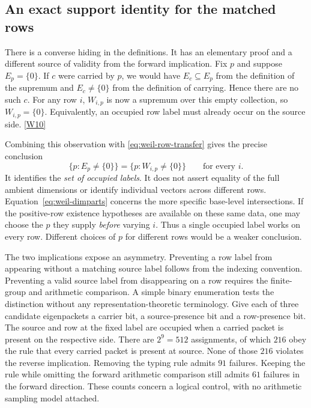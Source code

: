 \documentclass[12pt,letterpaper]{article}
\begin{document}
\subsection{An exact support identity for the matched rows}
\label{sec:support-equality}
There is a converse hiding in the definitions. It has an elementary proof and a different source of validity from the forward implication. Fix \(p\) and suppose \(E_p=\{0\}\). If \(c\) were carried by \(p\), we would have \(E_c\subseteq E_p\) from the definition of the supremum and \(E_c\ne\{0\}\) from the definition of carrying. Hence there are no such \(c\). For any row \(i\), \(W_{i,p}\) is now a supremum over this empty collection, so \(W_{i,p}=\{0\}\). Equivalently, an occupied row label must already occur on the source side. \href{https://github.com/nousentllc/riemann-hypothesis/blob/40e56bab026552e089d7afcfeff08d2defb9c005/src/Formalism/LocalToGlobal/IndefiniteReal/ZeroPartEigenvalueConvention.lean#L103-L213}{\textsf{[W10]}}

Combining this observation with \eqref{eq:weil-row-transfer} gives the precise conclusion
\[
   \{p:E_p\ne\{0\}\}=\{p:W_{i,p}\ne\{0\}\}
       \qquad \text{for every }i .
\]
It identifies the \emph{set of occupied labels}. It does not assert equality of the full ambient dimensions or identify individual vectors across different rows. Equation~\eqref{eq:weil-dimparts} concerns the more specific base-level intersections. If the positive-row existence hypotheses are available on these same data, one may choose the \(p\) they supply \emph{before} varying \(i\). Thus a single occupied label works on every row. Different choices of \(p\) for different rows would be a weaker conclusion.

The two implications expose an asymmetry. Preventing a row label from appearing without a matching source label follows from the indexing convention. Preventing a valid source label from disappearing on a row requires the finite-group and arithmetic comparison. A simple binary enumeration tests the distinction without any representation-theoretic terminology. Give each of three candidate eigenpackets a carrier bit, a source-presence bit and a row-presence bit. The source and row at the fixed label are occupied when a carried packet is present on the respective side. There are \(2^9=512\) assignments, of which \(216\) obey the rule that every carried packet is present at source. None of those \(216\) violates the reverse implication. Removing the typing rule admits \(91\) failures. Keeping the rule while omitting the forward arithmetic comparison still admits \(61\) failures in the forward direction. These counts concern a logical control, with no arithmetic sampling model attached.
\end{document}
